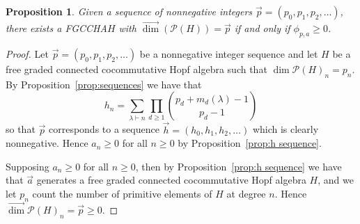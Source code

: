 \documentclass[11pt]{amsart}
\newtheorem{proposition}[theorem]{Proposition}
\theoremstyle{definition}
\numberwithin{equation}{section}
\newcommand{\FGCCHA}{\textsf{FGCCHA}\xspace}
\newcommand{\vecdim}{\overrightarrow{\dim}}
\newcommand{\felix}[1]{\todo[size=\tiny,color=Cyan]{#1 \\ \hfill --- Félix}}
\begin{document}
\begin{proposition}
\label{prop:UniqueBySequence}
	Given a sequence of nonnegative integers $\vec{p} = (p_0, p_1, p_2, \ldots)$, there exists a \FGCCHA $H$ with $\vecdim(\mathcal{P}(H)) = \vec{p}$ if and only if $\phi_{p,a} \geq 0$.
\end{proposition}

\begin{proof}	
    Let \(\vec{p} = (p_0, p_1, p_2, \ldots)\) be a nonnegative integer sequence and let \(H\) be a 
    free graded connected cocommutative Hopf algebra such that \(\dim \mathcal{P}(H)_n = p_n\).
    By Proposition~\ref{prop:sequences} we have that
    \[
        h_n = \sum_{\lambda \vdash n} \prod_{d \geq 1} \binom{p_d + m_d(\lambda) -1}{p_d -1}
    \]
    so that \(\vec{p}\)  corresponds to a sequence \(\vec{h} = (h_0, h_1, h_2, \ldots)\) which is clearly nonnegative. 
    Hence \(a_n \geq 0\) 
    for all \(n \geq 0\) by Proposition~\ref{prop:h sequence}.

    Supposing \(a_n \geq 0\) for all \(n \geq 0\), then by Proposition~\ref{prop:h sequence} we have that \(\vec{a}\) generates a free graded connected 
    cocommutative Hopf algebra \(H\), and we let \(p_n\) count the number of primitive elements of \(H\) at degree \(n\).
    Hence \(\vec{\dim} \mathcal{P}(H)_n = \vec{p}\geq 0\).

\end{proof} 
\end{document}
